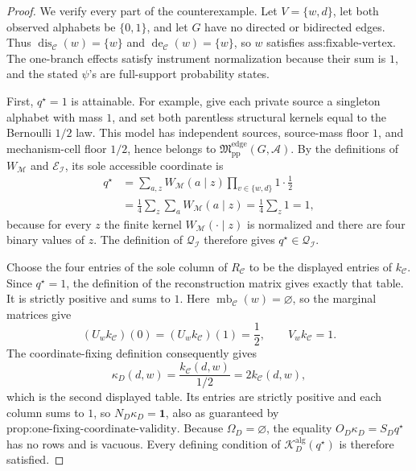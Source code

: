 \documentclass{article}
\begin{document}
\begin{proof}
We verify every part of the counterexample.  Let \(V=\{w,d\}\), let both observed alphabets be \(\{0,1\}\), and let \(G\) have no directed or bidirected edges.  Thus \(\operatorname{dis}_{\mathcal C}(w)=\{w\}\) and \(\operatorname{de}_{\mathcal C}(w)=\{w\}\), so \(w\) satisfies \(\text{ass:fixable-vertex}\).  The one-branch effects satisfy instrument normalization because their sum is \(1\), and the stated \(\psi\)'s are full-support probability states.

First, \(q^{\star}=1\) is attainable.  For example, give each private source a singleton alphabet with mass \(1\), and set both parentless structural kernels equal to the Bernoulli \(1/2\) law.  This model has independent sources, source-mass floor \(1\), and mechanism-cell floor \(1/2\), hence belongs to \(\mathfrak M_{\mathrm{pp}}^{\mathrm{edge}}(G,\mathcal A)\).  By the definitions of \(W_{\mathcal M}\) and \(\mathcal E_{\mathcal I}\), its sole accessible coordinate is
\[
\begin{aligned}
q^{\star}
&=\sum_{a,z}W_{\mathcal M}(a\mid z)
  \prod_{v\in\{w,d\}}1\cdot\frac12\\
&=\frac14\sum_z\sum_a W_{\mathcal M}(a\mid z)
=\frac14\sum_z1=1,
\end{aligned}
\]
because for every \(z\) the finite kernel \(W_{\mathcal M}(\cdot\mid z)\) is normalized and there are four binary values of \(z\).  The definition of \(\mathcal Q_{\mathcal I}\) therefore gives \(q^{\star}\in\mathcal Q_{\mathcal I}\).

Choose the four entries of the sole column of \(R_{\mathcal C}\) to be the displayed entries of \(k_{\mathcal C}\).  Since \(q^{\star}=1\), the definition of the reconstruction matrix gives exactly that table.  It is strictly positive and sums to \(1\).  Here \(\operatorname{mb}_{\mathcal C}(w)=\varnothing\), so the marginal matrices give
\[
(U_wk_{\mathcal C})(0)=(U_wk_{\mathcal C})(1)=\frac12,
\qquad V_wk_{\mathcal C}=1.
\]
The coordinate-fixing definition consequently gives
\[
\kappa_D(d,w)=\frac{k_{\mathcal C}(d,w)}{1/2}=2k_{\mathcal C}(d,w),
\]
which is the second displayed table.  Its entries are strictly positive and each column sums to \(1\), so \(N_D\kappa_D=\mathbf1\), also as guaranteed by \(\text{prop:one-fixing-coordinate-validity}\).  Because \(\Omega_D=\varnothing\), the equality \(O_D\kappa_D=S_Dq^{\star}\) has no rows and is vacuous.  Every defining condition of \(\mathcal K_D^{\mathrm{alg}}(q^{\star})\) is therefore satisfied.


\end{proof}
\end{document}
